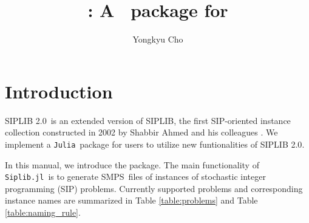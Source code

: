 \documentclass{hitec}
\title{\siplibjl: A \julia\ package for \siplibtwo}
\author{Yongkyu Cho}
\newcommand{\siplibtwo}{\textsf{SIPLIB 2.0}}
\newcommand{\siplib}{\textsf{SIPLIB}}
\newcommand{\smps}{\textsf{SMPS}}
\newcommand{\dcap}{\textsf{DCAP}}
\newcommand{\mptsps}{\textsf{MPTSPs}}
\newcommand{\sizes}{\textsf{SIZES}}
\newcommand{\smkp}{\textsf{SMKP}}
\newcommand{\sslp}{\textsf{SSLP}}
\newcommand{\suc}{\textsf{SUC}}
\newcommand{\julia}{\texttt{Julia}}
\newcommand{\siplibjl}{\texttt{Siplib.jl}}
\begin{document}
	\maketitle
	\section{Introduction}
	\siplibtwo\ is an extended version of \siplib, the first SIP-oriented instance collection constructed in 2002 by Shabbir Ahmed and his colleagues \cite{web:SIPLIB1}. We implement a \julia\ package for users to utilize new funtionalities of \siplibtwo. 
	
	In this manual, we introduce the package. The main functionality of \siplibjl\ is to generate \smps\ files of instances of stochastic integer programming (SIP) problems. Currently supported problems and corresponding instance names are summarized in Table \ref{table:problems} and Table \ref{table:naming_rule}.
%				
\end{document}
